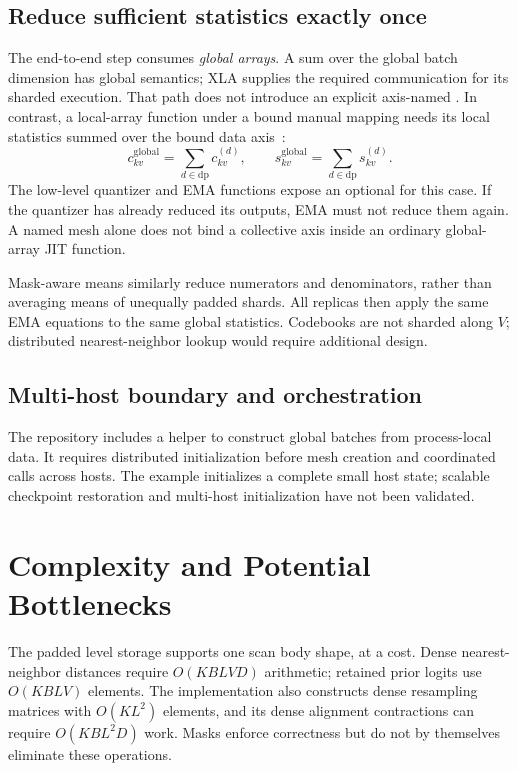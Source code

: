 \documentclass[11pt,a4paper]{article}
\begin{document}
\subsection{Reduce sufficient statistics exactly once}
The end-to-end step consumes \emph{global arrays}. A sum over the global batch
dimension has global semantics; XLA supplies the required communication for its
sharded execution. That path does not introduce an explicit axis-named
. In contrast, a local-array function under a bound manual mapping
needs its local statistics summed over the bound data axis~\citep{jaxmanual}:
\begin{equation}
 c_{kv}^{\mathrm{global}}=\sum_{d\in\mathrm{dp}}c_{kv}^{(d)},\qquad
 s_{kv}^{\mathrm{global}}=\sum_{d\in\mathrm{dp}}s_{kv}^{(d)}.
\end{equation}
The low-level quantizer and EMA functions expose an optional 
for this case. If the quantizer has already reduced its outputs, EMA must not
reduce them again. A named mesh alone does not bind a collective axis inside
an ordinary global-array JIT function.

Mask-aware means similarly reduce numerators and denominators, rather than
averaging means of unequally padded shards. All replicas then apply the same
EMA equations to the same global statistics. Codebooks are not sharded along
\(V\); distributed nearest-neighbor lookup would require additional design.

\subsection{Multi-host boundary and orchestration}
The repository includes a helper to construct global batches from
process-local data. It requires distributed initialization before mesh creation
and coordinated calls across hosts. The example initializes a complete small
host state; scalable checkpoint restoration and multi-host initialization have
not been validated.

\section{Complexity and Potential Bottlenecks}
\label{sec:complexity}
The padded level storage supports one scan body shape, at a cost. Dense
nearest-neighbor distances require \(O(KBLVD)\) arithmetic; retained prior
logits use \(O(KBLV)\) elements. The implementation also constructs dense
resampling matrices with \(O(KL^2)\) elements, and its dense alignment
contractions can require \(O(KBL^2D)\) work. Masks enforce correctness but do
not by themselves eliminate these operations.
\end{document}
